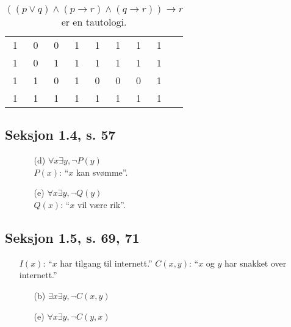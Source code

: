 \documentclass[a4paper, 12pt]{article}  %
\newcommand{\rarr}{\rightarrow}
\begin{document}
\begin{enumerate}
\begin{enumerate}
\begin{table}[h]
\begin{center}
\begin{tabular}{|c|c|c|c|c|c|c|c|c|}
                                1   & 0   & 0   & 1          & 1           & 1           & 1                                                & 1                                                          \\
                                1   & 0   & 1   & 1          & 1           & 1           & 1                                                & 1                                                          \\
                                1   & 1   & 0   & 1          & 0           & 0           & 0                                                & 1                                                          \\
                                1   & 1   & 1   & 1          & 1           & 1           & 1                                                & 1                                                          \\
                                \hline
                            \end{tabular}
                            \caption*{$((p \lor q) \land (p \rarr r) \land (q \rarr r)) \rarr r$ er en tautologi.}
                        \end{center}
                    \end{table}
          \end{enumerate}
\end{enumerate}
\newpage

\subsection*{Seksjon 1.4, s. 57}
\begin{enumerate}
    \item [\boxed{24}]
          \begin{enumerate}
              \item [(d)] $\forall x \exists y, \neg P(y)$ \\
                    $P(x)$: ``$x$ kan svømme''.
              \item [(e)] $\forall x \exists y, \neg Q(y)$ \\
                    $Q(x)$: ``$x$ vil være rik''.
          \end{enumerate}
\end{enumerate}

\subsection*{Seksjon 1.5, s. 69, 71}
\begin{enumerate}
    \item [\boxed{12}] $I(x)$: ``$x$ har tilgang til internett.'' $C(x,y)$: ``$x$ og $y$ har snakket over internett.''
          \begin{enumerate}
              \item [(b)] $\exists x \exists y, \neg C(x,y)$
              \item [(e)] $\forall x \exists y, \neg C(y,x)$
          \end{enumerate}
\end{enumerate}
\end{document}
